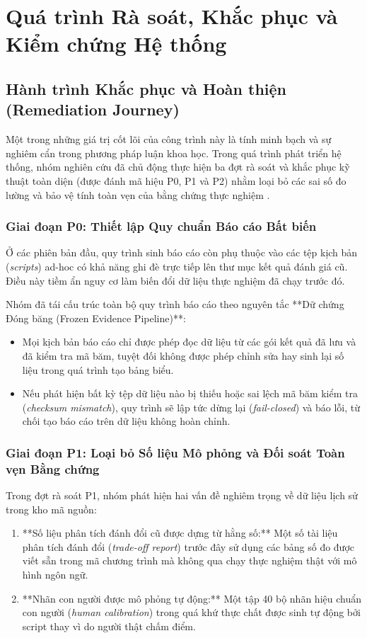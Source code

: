 \section{Quá trình Rà soát, Khắc phục và Kiểm chứng Hệ thống}

\subsection{Hành trình Khắc phục và Hoàn thiện (Remediation Journey)}
Một trong những giá trị cốt lõi của công trình này là tính minh bạch và sự nghiêm cẩn trong phương pháp luận khoa học. Trong quá trình phát triển hệ thống, nhóm nghiên cứu đã chủ động thực hiện ba đợt rà soát và khắc phục kỹ thuật toàn diện (được đánh mã hiệu P0, P1 và P2) nhằm loại bỏ các sai số đo lường và bảo vệ tính toàn vẹn của bằng chứng thực nghiệm .

\subsubsection{Giai đoạn P0: Thiết lập Quy chuẩn Báo cáo Bất biến}
Ở các phiên bản đầu, quy trình sinh báo cáo còn phụ thuộc vào các tệp kịch bản (\textit{scripts}) ad-hoc có khả năng ghi đè trực tiếp lên thư mục kết quả đánh giá cũ. Điều này tiềm ẩn nguy cơ làm biến đổi dữ liệu thực nghiệm đã chạy trước đó.

Nhóm đã tái cấu trúc toàn bộ quy trình báo cáo theo nguyên tắc **Dữ chứng Đóng băng (Frozen Evidence Pipeline)**:
\begin{itemize}
    \item Mọi kịch bản báo cáo chỉ được phép đọc dữ liệu từ các gói kết quả đã lưu và đã kiểm tra mã băm, tuyệt đối không được phép chỉnh sửa hay sinh lại số liệu trong quá trình tạo bảng biểu.
    \item Nếu phát hiện bất kỳ tệp dữ liệu nào bị thiếu hoặc sai lệch mã băm kiểm tra (\textit{checksum mismatch}), quy trình sẽ lập tức dừng lại (\textit{fail-closed}) và báo lỗi, từ chối tạo báo cáo trên dữ liệu không hoàn chỉnh.
\end{itemize}

\subsubsection{Giai đoạn P1: Loại bỏ Số liệu Mô phỏng và Đối soát Toàn vẹn Bằng chứng}
Trong đợt rà soát P1, nhóm phát hiện hai vấn đề nghiêm trọng về dữ liệu lịch sử trong kho mã nguồn:
\begin{enumerate}
    \item **Số liệu phân tích đánh đổi cũ được dựng từ hằng số:** Một số tài liệu phân tích đánh đổi (\textit{trade-off report}) trước đây sử dụng các bảng số đo được viết sẵn trong mã chương trình mà không qua chạy thực nghiệm thật với mô hình ngôn ngữ.
    \item **Nhãn con người được mô phỏng tự động:** Một tập 40 bộ nhãn hiệu chuẩn con người (\textit{human calibration}) trong quá khứ thực chất được sinh tự động bởi script thay vì do người thật chấm điểm.
\end{enumerate}

